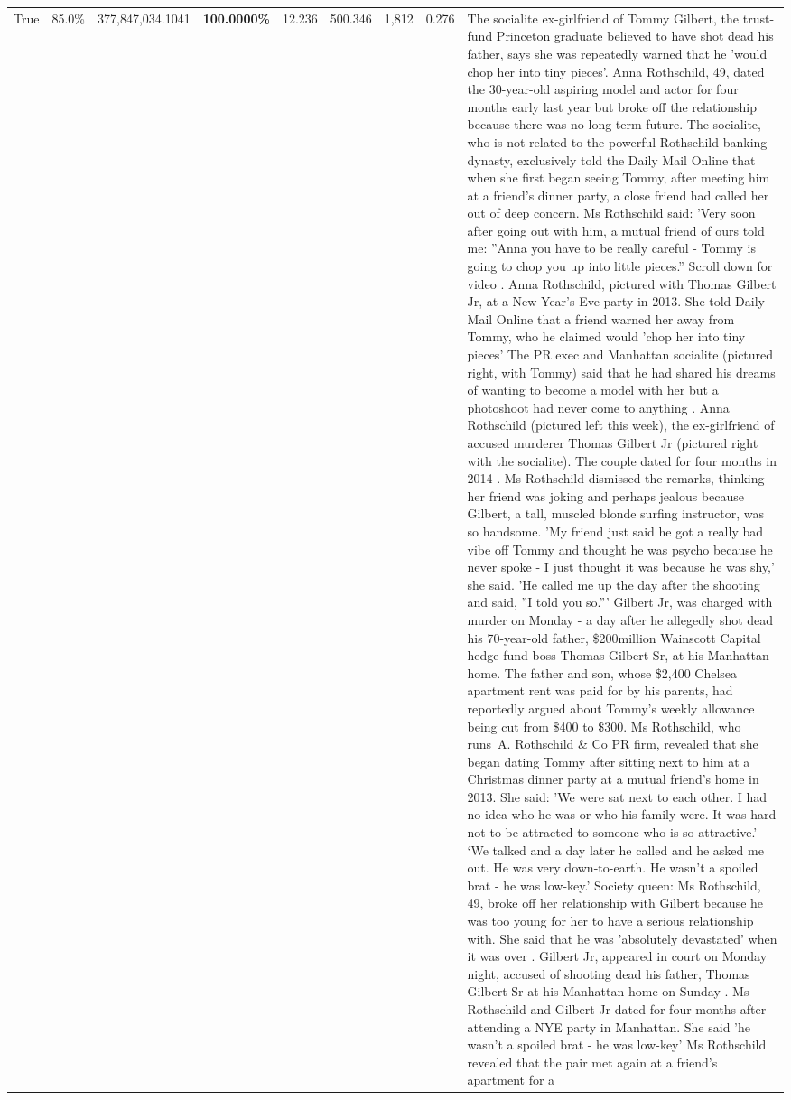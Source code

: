 \begin{table}[H]
\begin{tabular}{lllrlllll}
True & 85.0\% & 377,847,034.1041 & \bfseries \color{red} 100.0000\% & 12.236 & 500.346 & 1,812 & 0.276 & The socialite ex-girlfriend of Tommy Gilbert, the trust-fund Princeton graduate believed to have shot dead his father, says she was repeatedly warned that he 'would chop her into tiny pieces'. Anna Rothschild, 49, dated the 30-year-old aspiring model and actor for four months early last year but broke off the relationship because there was no long-term future. The socialite, who is not related to the powerful Rothschild banking dynasty, exclusively told the Daily Mail Online that when she first began seeing Tommy, after meeting him at a friend's dinner party, a close friend had called her out of deep concern. Ms Rothschild said: 'Very soon after going out with him, a mutual friend of ours told me: ''Anna you have to be really careful - Tommy is going to chop you up into little pieces.'' Scroll down for video . Anna Rothschild, pictured with Thomas Gilbert Jr, at a New Year's Eve party in 2013. She told Daily Mail Online that a friend warned her away from Tommy, who he claimed would 'chop her into tiny pieces' The PR exec and Manhattan socialite (pictured right, with Tommy) said that he had shared his dreams of wanting to become a model with her but a photoshoot had never come to anything . Anna Rothschild (pictured left this week), the ex-girlfriend of accused murderer Thomas Gilbert Jr (pictured right with the socialite). The couple dated for four months in 2014 . Ms Rothschild dismissed the remarks, thinking her friend was joking and perhaps jealous because Gilbert, a tall, muscled blonde surfing instructor, was so handsome. 'My friend just said he got a really bad vibe off Tommy and thought he was psycho because he never spoke - I just thought it was because he was shy,' she said. 'He called me up the day after the shooting and said, ''I told you so.''' Gilbert Jr, was charged with murder on Monday - a day after he allegedly shot dead his 70-year-old father, \$200million Wainscott Capital hedge-fund boss Thomas Gilbert Sr, at his Manhattan home. The father and son, whose \$2,400 Chelsea apartment rent was paid for by his parents, had reportedly argued about Tommy's weekly allowance being cut from \$400 to \$300. Ms Rothschild, who runs A. Rothschild \& Co PR firm, revealed that she began dating Tommy after sitting next to him at a Christmas dinner party at a mutual friend's home in 2013. She said: 'We were sat next to each other. I had no idea who he was or who his family were. It was hard not to be attracted to someone who is so attractive.' ‘We talked and a day later he called and he asked me out. He was very down-to-earth. He wasn’t a spoiled brat - he was low-key.’ Society queen: Ms Rothschild, 49, broke off her relationship with Gilbert because he was too young for her to have a serious relationship with. She said that he was 'absolutely devastated' when it was over . Gilbert Jr, appeared in court on Monday night, accused of shooting dead his father, Thomas Gilbert Sr at his Manhattan home on Sunday . Ms Rothschild and Gilbert Jr dated for four months after attending a NYE party in Manhattan. She said 'he wasn't a spoiled brat - he was low-key' Ms Rothschild revealed that the pair met again at a friend’s apartment for a 
\end{tabular}
\end{table}
